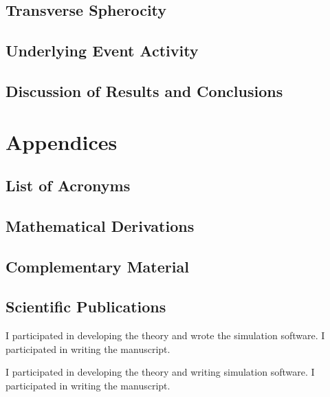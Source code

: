 \documentclass[11pt]{book}
\begin{document}
\chapter{Transverse Spherocity}
%
\chapter{Underlying Event Activity}
%
\chapter{Discussion of Results and Conclusions}


\appendix
\part{Appendices}
\chapter{List of Acronyms}

\chapter{Mathematical Derivations}

\chapter{Complementary Material}

\chapter{Scientific Publications}



I participated in developing the theory and wrote the simulation software. I participated in writing the manuscript.


I participated in developing the theory and writing simulation software. I participated in writing the manuscript.






\renewcommand{\bibname}{References}


\end{document}

